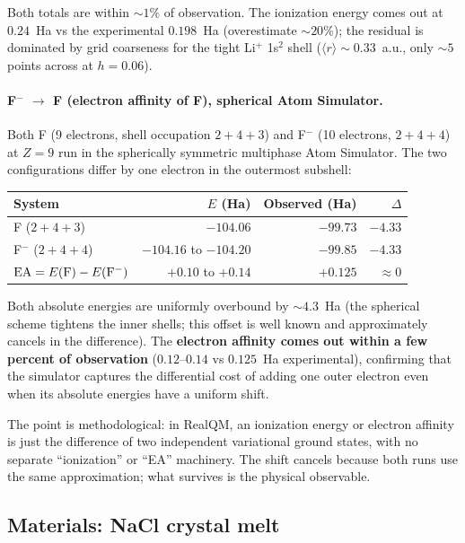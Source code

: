 \documentclass[11pt]{article}
\begin{document}
Both totals are within $\sim 1\%$ of observation. The ionization energy comes out at $0.24$~Ha vs the experimental $0.198$~Ha (overestimate $\sim 20\%$); the residual is dominated by grid coarseness for the tight Li$^+$ 1s$^2$ shell ($\langle r \rangle \sim 0.33$~a.u., only $\sim 5$ points across at $h = 0.06$).

\paragraph{F$^-$ $\to$ F (electron affinity of F), spherical Atom Simulator.}
Both F (9 electrons, shell occupation $2+4+3$) and F$^-$ (10 electrons, $2+4+4$) at $Z = 9$ run in the spherically symmetric multiphase Atom Simulator. The two configurations differ by one electron in the outermost subshell:

\begin{center}
\begin{tabular}{lrrr}
\toprule
System & $E$ (Ha) & Observed (Ha) & $\Delta$ \\
\midrule
F  ($2{+}4{+}3$) & $-104.06$       & $-99.73$  & $-4.33$ \\
F$^-$ ($2{+}4{+}4$) & $-104.16$ to $-104.20$ & $-99.85$ & $-4.33$ \\
\midrule
$\mathrm{EA} = E({\rm F}) - E({\rm F}^-)$ & $+0.10$ to $+0.14$ & $+0.125$ & $\approx 0$ \\
\bottomrule
\end{tabular}
\end{center}

Both absolute energies are uniformly overbound by $\sim 4.3$~Ha (the spherical scheme tightens the inner shells; this offset is well known and approximately cancels in the difference). The \textbf{electron affinity comes out within a few percent of observation} ($0.12$--$0.14$ vs $0.125$~Ha experimental), confirming that the simulator captures the differential cost of adding one outer electron even when its absolute energies have a uniform shift.

The point is methodological: in RealQM, an ionization energy or electron affinity is just the difference of two independent variational ground states, with no separate ``ionization'' or ``EA'' machinery. The shift cancels because both runs use the same approximation; what survives is the physical observable.

\subsection{Materials: NaCl crystal melt}\label{sec:nacl}
\end{document}
